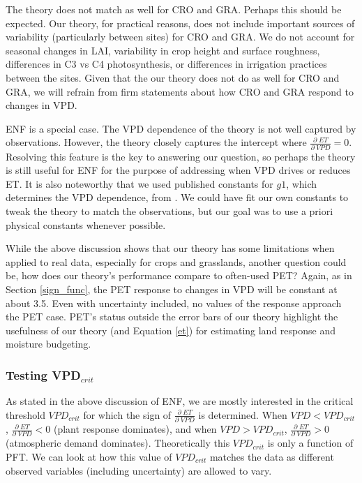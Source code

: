 \documentclass[draft,linenumbers]{agujournal}
\begin{document}
The theory does not match as well for CRO and GRA. Perhaps this should be expected. Our theory, for practical reasons, does not include important sources of variability (particularly between sites) for CRO and GRA. We do not account for seasonal changes in LAI, variability in crop height and surface roughness, differences in C3 vs C4 photosynthesis, or differences in irrigation practices between the sites. Given that the our theory does not do as well for CRO and GRA, we will refrain from firm statements about how CRO and GRA respond to changes in VPD.

ENF is a special case. The VPD dependence of the theory is not well captured by observations. However, the theory closely captures the intercept where $\frac{\partial \; ET}{\partial \; VPD} = 0$. Resolving this feature is the key to answering our question, so perhaps the theory is still useful for ENF for the purpose of addressing when VPD drives or reduces ET. It is also noteworthy that we used published constants for $g1$, which determines the VPD dependence, from \cite{Lin_2015}. We could have fit our own constants to tweak the theory to match the observations, but our goal was to use a priori physical constants whenever possible.

While the above discussion shows that our theory has some limitations when applied to real data, especially for crops and grasslands, another question could be, how does our theory's performance compare to often-used PET? Again, as in Section \ref{sign_func}, the PET response to changes in VPD will be constant at about 3.5. Even with uncertainty included, no values of the response approach the PET case. PET's status outside the error bars of our theory highlight the usefulness of our theory (and Equation \ref{et}) for estimating land response and moisture budgeting.

\subsubsection{Testing VPD$_{crit}$}
As stated in the above discussion of ENF, we are mostly interested in the critical threshold $VPD_{crit}$ for which the sign of  $\frac{\partial \; ET}{\partial \; VPD}$ is determined. When $VPD < VPD_{crit}$, $\frac{\partial \; ET}{\partial \; VPD}  < 0$ (plant response dominates), and when $VPD > VPD_{crit}$, $\frac{\partial \; ET}{\partial \; VPD} > 0$ (atmospheric demand dominates). Theoretically this $VPD_{crit}$ is only a function of PFT. We can look at how this value of $VPD_{crit}$ matches the data as different observed variables (including uncertainty) are allowed to vary.
\end{document}
